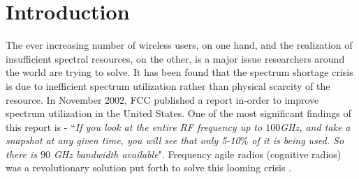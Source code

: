 \chapter{Introduction}
\label{chap:intro}
The ever increasing number of wireless users, on one hand, and the realization of insufficient spectral resources, on the other, is a major issue researchers around the world are trying to solve. It has been found that the spectrum shortage crisis is due to inefficient spectrum utilization rather than physical scarcity of the resource. In November 2002, FCC published a report \cite{ref:FCC}  in-order to improve spectrum utilization in the United States. One of the most significant findings of this report is - ``{\em If you look at the entire RF frequency up to $100$GHz, and take a snapshot at any given time, you will see that only 5-10$\%$ of it is being used. So there is $90$ GHz bandwidth available}". Frequency agile radios (cognitive radios) was a revolutionary solution put forth to solve this looming crisis \cite{ref:haykin}.